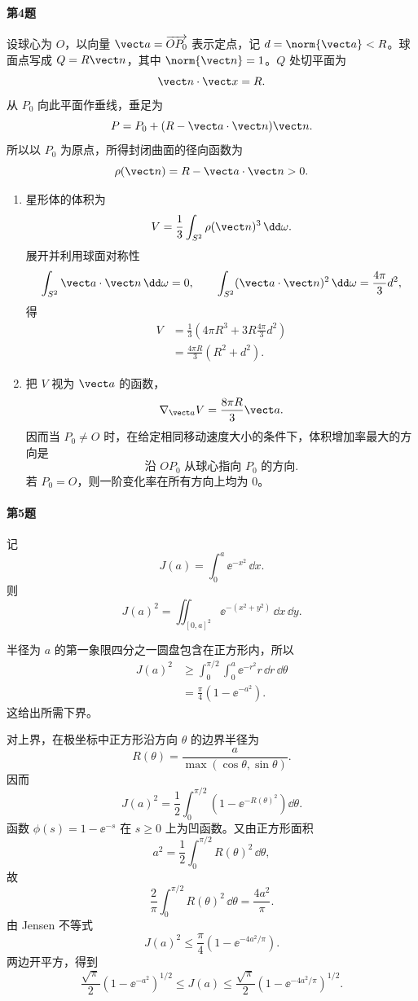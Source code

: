 \paragraph{第4题}
\begin{xsolution}
设球心为 $O$，以向量 $\vect a=\overrightarrow{OP_0}$ 表示定点，记 $d=\norm{\vect a}<R$。球面点写成 $Q=R\vect n$，其中 $\norm{\vect n}=1$。$Q$ 处切平面为
\[
  \vect n\cdot\vect x=R.
\]
从 $P_0$ 向此平面作垂线，垂足为
\[
  P=P_0+(R-\vect a\cdot\vect n)\vect n.
\]
所以以 $P_0$ 为原点，所得封闭曲面的径向函数为
\[
  \rho(\vect n)=R-\vect a\cdot\vect n>0.
\]

\begin{enumerate}[label=(\arabic*)]
  \item 星形体的体积为
  \[
    V=\frac13\int_{S^2}\rho(\vect n)^3\,\dd\omega.
  \]
  展开并利用球面对称性
  \[
    \int_{S^2}\vect a\cdot\vect n\,\dd\omega=0,
    \qquad
    \int_{S^2}(\vect a\cdot\vect n)^2\,\dd\omega
    =\frac{4\pi}{3}d^2,
  \]
  得
  \begin{align*}
    V&=\frac13\left(4\pi R^3+3R\frac{4\pi}{3}d^2\right)\\
     &=\boxed{\frac{4\pi R}{3}(R^2+d^2)}.
  \end{align*}

  \item 把 $V$ 视为 $\vect a$ 的函数，
  \[
    \nabla_{\vect a}V=\frac{8\pi R}{3}\vect a.
  \]
  因而当 $P_0\ne O$ 时，在给定相同移动速度大小的条件下，体积增加率最大的方向是
  \[
    \boxed{\text{沿 }OP_0\text{ 从球心指向 }P_0\text{ 的方向}}.
  \]
  若 $P_0=O$，则一阶变化率在所有方向上均为 $0$。
\end{enumerate}
\end{xsolution}

\paragraph{第5题}
\begin{xsolution}
记
\[
  J(a)=\int_0^a\ee^{-x^2}\,\dd x.
\]
则
\[
  J(a)^2=\iint_{[0,a]^2}\ee^{-(x^2+y^2)}\,\dd x\,\dd y.
\]

半径为 $a$ 的第一象限四分之一圆盘包含在正方形内，所以
\begin{align*}
  J(a)^2
  &\ge\int_0^{\pi/2}\int_0^a\ee^{-r^2}r\,\dd r\,\dd\theta\\
  &=\frac\pi4(1-\ee^{-a^2}).
\end{align*}
这给出所需下界。

对上界，在极坐标中正方形沿方向 $\theta$ 的边界半径为
\[
  R(\theta)=\frac{a}{\max(\cos\theta,\sin\theta)}.
\]
因而
\[
  J(a)^2=\frac12\int_0^{\pi/2}
  \left(1-\ee^{-R(\theta)^2}\right)\dd\theta.
\]
函数 $\phi(s)=1-\ee^{-s}$ 在 $s\ge0$ 上为凹函数。又由正方形面积
\[
  a^2=\frac12\int_0^{\pi/2}R(\theta)^2\,\dd\theta,
\]
故
\[
  \frac2\pi\int_0^{\pi/2}R(\theta)^2\,\dd\theta
  =\frac{4a^2}{\pi}.
\]
由 Jensen 不等式
\[
  J(a)^2\le\frac\pi4
  \left(1-\ee^{-4a^2/\pi}\right).
\]
两边开平方，得到
\[
  \boxed{
  \frac{\sqrt\pi}{2}(1-\ee^{-a^2})^{1/2}
  \le J(a)\le
  \frac{\sqrt\pi}{2}(1-\ee^{-4a^2/\pi})^{1/2}}.
\]
\end{xsolution}

